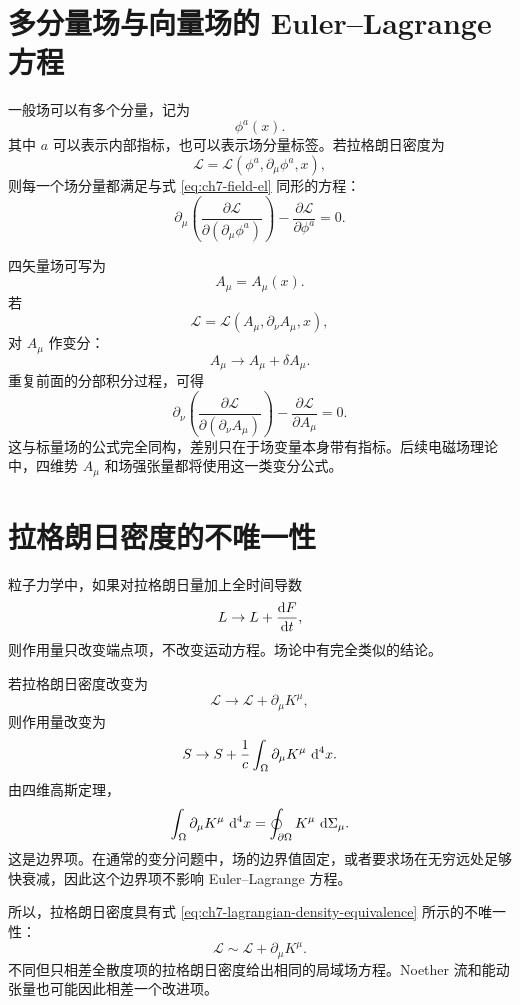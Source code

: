 \section{多分量场与向量场的 Euler--Lagrange 方程}

一般场可以有多个分量，记为
\[
\phi^{a}(x).
\]
其中 $a$ 可以表示内部指标，也可以表示场分量标签。若拉格朗日密度为
\[
\mathcal{L}=\mathcal{L}(\phi^{a},\partial_{\mu}\phi^{a},x),
\]
则每一个场分量都满足与式 \eqref{eq:ch7-field-el} 同形的方程：
\begin{equation}
	\partial_{\mu}\left(
	\frac{\partial\mathcal{L}}{\partial(\partial_{\mu}\phi^{a})}
	\right)
	-
	\frac{\partial\mathcal{L}}{\partial\phi^{a}}
	=0.
	\label{eq:ch7-multifield-el}
\end{equation}

四矢量场可写为
\[
A_{\mu}=A_{\mu}(x).
\]
若
\[
\mathcal{L}=\mathcal{L}(A_{\mu},\partial_{\nu}A_{\mu},x),
\]
对 $A_{\mu}$ 作变分：
\[
A_{\mu}\rightarrow A_{\mu}+\delta A_{\mu}.
\]
重复前面的分部积分过程，可得
\begin{equation}
	\partial_{\nu}\left(
	\frac{\partial\mathcal{L}}{\partial(\partial_{\nu}A_{\mu})}
	\right)
	-
	\frac{\partial\mathcal{L}}{\partial A_{\mu}}
	=0.
	\label{eq:ch7-vector-field-el}
\end{equation}
这与标量场的公式完全同构，差别只在于场变量本身带有指标。后续电磁场理论中，四维势 $A_{\mu}$ 和场强张量都将使用这一类变分公式。

\section{拉格朗日密度的不唯一性}

粒子力学中，如果对拉格朗日量加上全时间导数
\[
L\rightarrow L+\frac{\mathop{}\!\mathrm{d} F}{\mathop{}\!\mathrm{d} t},
\]
则作用量只改变端点项，不改变运动方程。场论中有完全类似的结论。

若拉格朗日密度改变为
\[
\mathcal{L}\rightarrow \mathcal{L}+\partial_{\mu}K^{\mu},
\]
则作用量改变为
\[
S\rightarrow S+\frac{1}{c}\int_{\Omega}\partial_{\mu}K^{\mu}\,\mathop{}\!\mathrm{d}^{4}x.
\]
由四维高斯定理，
\[
\int_{\Omega}\partial_{\mu}K^{\mu}\,\mathop{}\!\mathrm{d}^{4}x
=
\oint_{\partial\Omega}K^{\mu}\,\mathop{}\!\mathrm{d}\Sigma_{\mu}.
\]
这是边界项。在通常的变分问题中，场的边界值固定，或者要求场在无穷远处足够快衰减，因此这个边界项不影响 Euler--Lagrange 方程。

所以，拉格朗日密度具有式 \eqref{eq:ch7-lagrangian-density-equivalence} 所示的不唯一性：
\begin{equation}
	\mathcal{L}\sim \mathcal{L}+\partial_{\mu}K^{\mu}.
	\label{eq:ch7-lagrangian-density-equivalence}
\end{equation}
不同但只相差全散度项的拉格朗日密度给出相同的局域场方程。Noether 流和能动张量也可能因此相差一个改进项。

